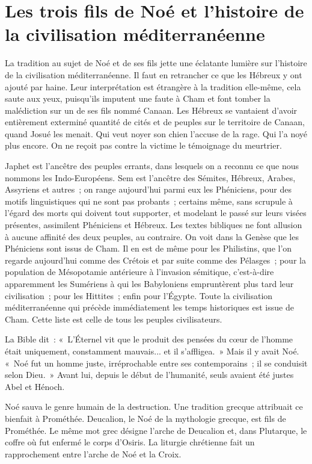 \documentclass[french,twoside]{book} %
\newcommand\chapteropen{} %
\newcommand\chaptercont{} %
\begin{document}
\chapteropen
\chapter[{Les trois fils de Noé et l'histoire de la civilisation méditerranéenne}]{Les trois fils de Noé et l'histoire de la civilisation méditerranéenne}

\chaptercont
\noindent La tradition au sujet de Noé et de ses fils jette une éclatante lumière sur l'histoire de la civilisation méditerranéenne. Il faut en retrancher ce que les Hébreux y ont ajouté par haine. Leur interprétation est étrangère à la tradition elle-même, cela saute aux yeux, puisqu'ils imputent une faute à Cham et font tomber la malédiction sur un de ses fils nommé Canaan. Les Hébreux se vantaient d'avoir entièrement exterminé quantité de cités et de peuples sur le territoire de Canaan, quand Josué les menait. Qui veut noyer son chien l'accuse de la rage. Qui l'a noyé plus encore. On ne reçoit pas contre la victime le témoignage du meurtrier.\par
Japhet est l'ancêtre des peuples errants, dans lesquels on a reconnu ce que nous nommons les Indo-Européens. Sem est l'ancêtre des Sémites, Hébreux, Arabes, Assyriens et autres ; on range aujourd'hui parmi eux les Phéniciens, pour des motifs linguistiques qui ne sont pas probants ; certains même, sans scrupule à l'égard des morts qui doivent tout supporter, et modelant le passé sur leurs visées présentes, assimilent Phéniciens et Hébreux. Les textes bibliques ne font allusion à aucune affinité des deux peuples, au contraire. On voit dans la Genèse que les Phéniciens sont issus de Cham. Il en est de même pour les Philistins, que l'on regarde aujourd'hui comme des Crétois et par suite comme des Pélasges ; pour la population de Mésopotamie antérieure à l'invasion sémitique, c'est-à-dire apparemment les Sumériens à qui les Babyloniens empruntèrent plus tard leur civilisation ; pour les Hittites ; enfin pour l'Égypte. Toute la civilisation méditerranéenne qui précède immédiatement les temps historiques est issue de Cham. Cette liste est celle de tous les peuples civilisateurs.\par
La Bible dit : « L'Éternel vit que le produit des pensées du cœur de l'homme était uniquement, constamment mauvais... et il s'affligea. » Mais il y avait Noé. « Noé fut un homme juste, irréprochable entre ses contemporains ; il se conduisit selon Dieu. » Avant lui, depuis le début de l'humanité, seuls avaient été justes Abel et Hénoch.\par
Noé sauva le genre humain de la destruction. Une tradition grecque attribuait ce bienfait à Prométhée. Deucalion, le Noé de la mythologie grecque, est fils de Prométhée. Le même mot grec désigne l'arche de Deucalion et, dans Plutarque, le coffre où fut enfermé le corps d'Osiris. La liturgie chrétienne fait un rapprochement entre l'arche de Noé et la Croix.\par
\end{document}

